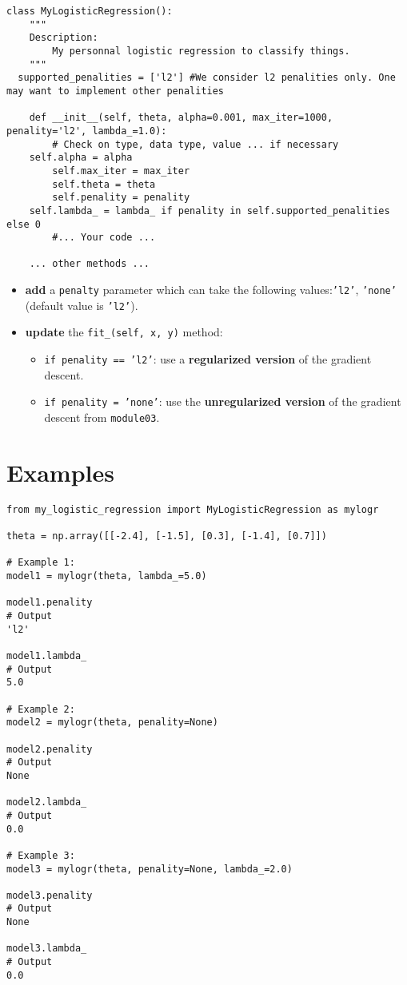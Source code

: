 \begin{verbatim}
class MyLogisticRegression():
	"""
	Description:
		My personnal logistic regression to classify things.
	"""
  supported_penalities = ['l2'] #We consider l2 penalities only. One may want to implement other penalities

	def __init__(self, theta, alpha=0.001, max_iter=1000, penality='l2', lambda_=1.0):
		# Check on type, data type, value ... if necessary
    self.alpha = alpha
		self.max_iter = max_iter
		self.theta = theta
		self.penality = penality
    self.lambda_ = lambda_ if penality in self.supported_penalities else 0
		#... Your code ...

	... other methods ...
\end{verbatim}
\begin{itemize}
	\item \textbf{add} a \texttt{penalty} parameter which can take the following values:\texttt{'l2'}, \texttt{'none'} (default value is \texttt{'l2'}).
  \end{itemize}
\begin{itemize}
  \item \textbf{update} the \texttt{fit\_(self, x, y)} method: 
  \begin{itemize}
    \item \texttt{if penality == 'l2'}: use a \textbf{regularized version} of the gradient descent.
    \item \texttt{if penality = 'none'}: use the \textbf{unregularized version} of the gradient descent from \texttt{module03}.
  \end{itemize}
\end{itemize}

\section*{Examples}
\begin{verbatim}
from my_logistic_regression import MyLogisticRegression as mylogr

theta = np.array([[-2.4], [-1.5], [0.3], [-1.4], [0.7]])

# Example 1:
model1 = mylogr(theta, lambda_=5.0)

model1.penality
# Output
'l2'

model1.lambda_
# Output
5.0

# Example 2:
model2 = mylogr(theta, penality=None)

model2.penality
# Output
None

model2.lambda_
# Output
0.0

# Example 3:
model3 = mylogr(theta, penality=None, lambda_=2.0)

model3.penality
# Output
None

model3.lambda_
# Output
0.0

\end{verbatim}

